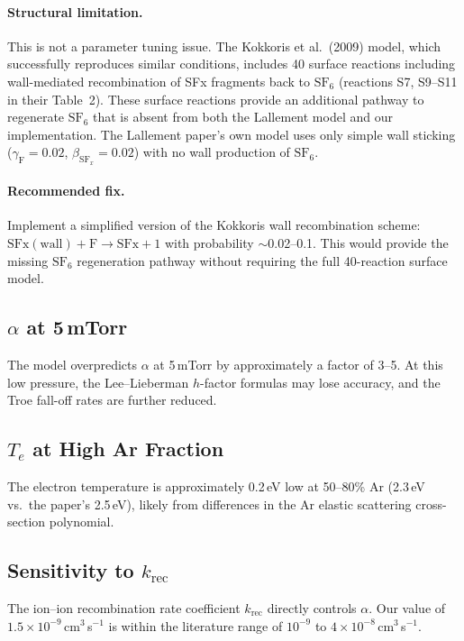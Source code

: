 \documentclass[11pt,a4paper]{article}
\newcommand{\SFx}{\mathrm{SF}_x}
\newcommand{\SFsix}{\mathrm{SF}_6}
\newcommand{\Te}{T_e}
\begin{document}
\paragraph{Structural limitation.}  This is not a parameter tuning issue.  The Kokkoris et al.\ (2009) model, which successfully reproduces similar conditions, includes 40 surface reactions including wall-mediated recombination of SFx fragments back to $\SFsix$ (reactions S7, S9--S11 in their Table~2).  These surface reactions provide an additional pathway to regenerate $\SFsix$ that is absent from both the Lallement model and our implementation.  The Lallement paper's own model uses only simple wall sticking ($\gamma_\mathrm{F} = 0.02$, $\beta_{\SFx} = 0.02$) with no wall production of $\SFsix$.

\paragraph{Recommended fix.} Implement a simplified version of the Kokkoris wall recombination scheme: $\mathrm{SFx(wall)} + \mathrm{F} \to \mathrm{SFx+1}$ with probability $\sim$0.02--0.1.  This would provide the missing $\SFsix$ regeneration pathway without requiring the full 40-reaction surface model.

\subsection{$\alpha$ at 5\,mTorr}

The model overpredicts $\alpha$ at 5\,mTorr by approximately a factor of 3--5.  At this low pressure, the Lee--Lieberman $h$-factor formulas may lose accuracy, and the Troe fall-off rates are further reduced.

\subsection{$\Te$ at High Ar Fraction}

The electron temperature is approximately 0.2\,eV low at 50--80\% Ar (2.3\,eV vs.\ the paper's 2.5\,eV), likely from differences in the Ar elastic scattering cross-section polynomial.

\subsection{Sensitivity to $k_\mathrm{rec}$}

The ion--ion recombination rate coefficient $k_\mathrm{rec}$ directly controls $\alpha$.  Our value of $1.5 \times 10^{-9}$\,cm$^3$\,s$^{-1}$ is within the literature range of $10^{-9}$ to $4 \times 10^{-8}$\,cm$^3$\,s$^{-1}$.
\end{document}
